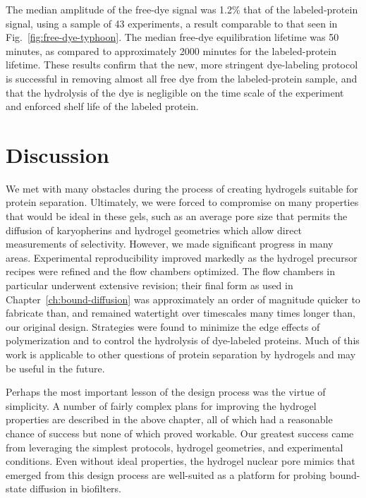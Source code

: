 The median amplitude of the free-dye signal was 1.2\% that of the labeled-protein signal, using a sample of 43 experiments, a result comparable to that seen in Fig.~\ref{fig:free-dye-typhoon}.  The median free-dye equilibration lifetime was 50 minutes, as compared to approximately 2000 minutes for the labeled-protein lifetime.  These results confirm that the new, more stringent dye-labeling protocol is successful in removing almost all free dye from the labeled-protein sample, and that the hydrolysis of the dye is negligible on the time scale of the experiment and enforced shelf life of the labeled protein.

\section{Discussion}

We met with many obstacles during the process of creating hydrogels suitable for protein separation.  Ultimately, we were forced to compromise on many properties that would be ideal in these gels, such as an average pore size that permits the diffusion of karyopherins and hydrogel geometries which allow direct measurements of selectivity.  However, we made significant progress in many areas.  Experimental reproducibility improved markedly as the hydrogel precursor recipes were refined and the flow chambers optimized.  The flow chambers in particular underwent extensive revision; their final form as used in Chapter~\ref{ch:bound-diffusion} was approximately an order of magnitude quicker to fabricate than, and remained watertight over timescales many times longer than, our original design.  Strategies were found to minimize the edge effects of polymerization and to control the hydrolysis of dye-labeled proteins.  Much of this work is applicable to other questions of protein separation by hydrogels and may be useful in the future.

Perhaps the most important lesson of the design process was the virtue of simplicity.  A number of fairly complex plans for improving the hydrogel properties are described in the above chapter, all of which had a reasonable chance of success but none of which proved workable.  Our greatest success came from leveraging the simplest protocols, hydrogel geometries, and experimental conditions.  Even without ideal properties, the hydrogel nuclear pore mimics that emerged from this design process are well-suited as a platform for probing bound-state diffusion in biofilters.


